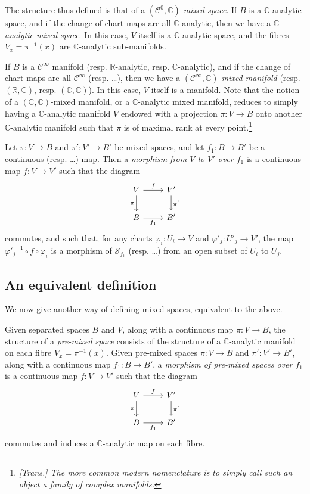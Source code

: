 \documentclass{article}
\newcommand{\RR}{\mathbb{R}}
\newcommand{\CC}{\mathbb{C}}
\newcommand{\oldpage}[1]{\marginpar{\footnotesize$\Big\vert$ \textit{p.~#1}}}
\begin{document}
The structure thus defined is that of a \emph{$(\mathscr{C}^0,\CC)$-mixed space}.
If $B$ is a $\CC$-analytic space, and if the change of chart maps are all $\CC$-analytic, then we have a \emph{$\CC$-analytic mixed space}.
In this case, $V$ itself is a $\CC$-analytic space, and the fibres $V_x=\pi^{-1}(x)$ are $\CC$-analytic sub-manifolds.

If $B$ is a $\mathscr{C}^\infty$ manifold (resp. $\RR$-analytic, resp. $\CC$-analytic), and if the change of chart maps are all $\mathscr{C}^\infty$ (resp. \ldots), then we have a \emph{$(\mathscr{C}^\infty,\CC)$-mixed manifold} (resp. $(\RR,\CC)$, resp. $(\CC,\CC)$).
In this case, $V$ itself is a manifold.
Note that the notion of a $(\CC,\CC)$-mixed manifold, or a $\CC$-analytic mixed manifold, reduces to simply having a $\CC$-analytic manifold $V$ endowed with a projection $\pi\colon V\to B$ onto another $\CC$-analytic manifold such that $\pi$ is of maximal rank at every point.\footnote{\emph{[Trans.] The more common modern nomenclature is to simply call such an object a \emph{family of complex manifolds}.}}

Let $\pi\colon V\to B$ and $\pi'\colon V'\to B'$ be mixed spaces, and let $f_1\colon B\to B'$ be a continuous (resp. \ldots) map.
Then a \emph{morphism from $V$ to $V'$ over $f_1$} is a continuous map $f\colon V\to V'$ such that the diagram
\[
  \begin{tikzcd}
    V \rar["f"] \dar[swap,"\pi"]
    & V' \dar["\pi'"]
  \\B \rar[swap,"f_1"]
    & B'
  \end{tikzcd}
\]
\oldpage{2-03}
commutes, and such that, for any charts $\varphi_i\colon U_i\to V$ and $\varphi'_j\colon U'_j\to V'$, the map ${\varphi'_j}^{-1}\circ f\circ\varphi_i$ is a morphism of $\mathscr{S}_{f_1}$ (resp. \ldots) from an open subset of $U_i$ to $U_j$.


\subsection{An equivalent definition}
\label{II.2}

We now give another way of defining mixed spaces, equivalent to the above.


Given separated spaces $B$ and $V$, along with a continuous map $\pi\colon V\to B$, the structure of a \emph{pre-mixed space} consists of the structure of a $\CC$-analytic manifold on each fibre $V_x=\pi^{-1}(x)$.
Given pre-mixed spaces $\pi\colon V\to B$ and $\pi'\colon V'\to B'$, along with a continuous map $f_1\colon B\to B'$, a \emph{morphism of pre-mixed spaces over $f_1$} is a continuous map $f\colon V\to V'$ such that the diagram
\[
  \begin{tikzcd}
    V \rar["f"] \dar[swap,"\pi"]
    & V' \dar["\pi'"]
  \\B \rar[swap,"f_1"]
    & B'
  \end{tikzcd}
\]
commutes and induces a $\CC$-analytic map on each fibre.
\end{document}
